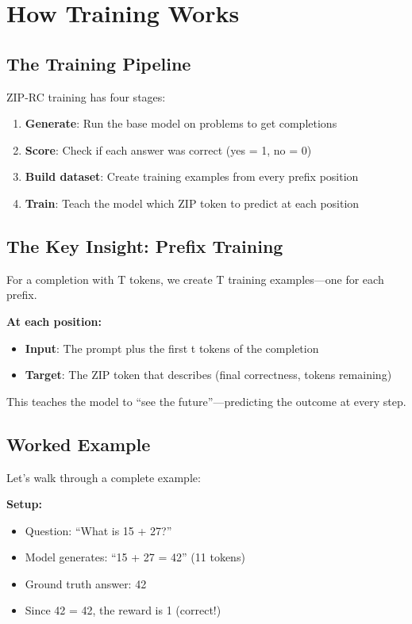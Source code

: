 \documentclass[11pt,a4paper]{article}
\begin{document}
\section{How Training Works}

\subsection{The Training Pipeline}

ZIP-RC training has four stages:

\begin{enumerate}
    \item \textbf{Generate}: Run the base model on problems to get completions
    \item \textbf{Score}: Check if each answer was correct (yes = 1, no = 0)
    \item \textbf{Build dataset}: Create training examples from every prefix position
    \item \textbf{Train}: Teach the model which ZIP token to predict at each position
\end{enumerate}

\subsection{The Key Insight: Prefix Training}

For a completion with T tokens, we create T training examples---one for each prefix.

\textbf{At each position:}
\begin{itemize}
    \item \textbf{Input}: The prompt plus the first t tokens of the completion
    \item \textbf{Target}: The ZIP token that describes (final correctness, tokens remaining)
\end{itemize}

This teaches the model to ``see the future''---predicting the outcome at every step.

\subsection{Worked Example}

Let's walk through a complete example:

\textbf{Setup:}
\begin{itemize}
    \item Question: ``What is 15 + 27?''
    \item Model generates: ``15 + 27 = 42'' (11 tokens)
    \item Ground truth answer: 42
    \item Since 42 = 42, the reward is 1 (correct!)
\end{itemize}
\end{document}
